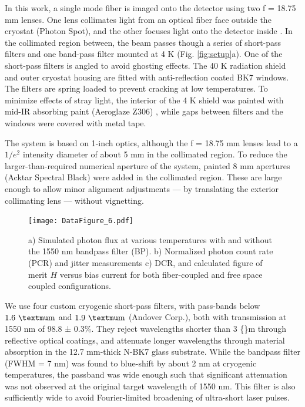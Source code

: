 \documentclass[12pt]{caltech_thesis}
\begin{document}
In this work, a single mode fiber is imaged onto the detector using two
f = 18.75 mm lenses. One lens collimates light from an optical fiber
face outside the cryostat (Photon Spot), and the other focuses light
onto the detector inside \autocite{Bellei:16}. In the collimated region
between, the beam passes though a series of short-pass filters and one
band-pass filter mounted at 4 K (Fig. \ref{fig:setup}a). One of the
short-pass filters is angled to avoid ghosting effects. The 40 K
radiation shield and outer cryostat housing are fitted with
anti-reflection coated BK7 windows. The filters are spring loaded to
prevent cracking at low temperatures. To minimize effects of stray
light, the interior of the 4 K shield was painted with mid-IR absorbing
paint (Aeroglaze Z306) \autocite{Persky1999}, while gaps between filters
and the windows were covered with metal tape.

The system is based on 1-inch optics, although the f = 18.75 mm lenses
lead to a \(1/e^2\) intensity diameter of about 5 mm in the collimated
region. To reduce the larger-than-required numerical aperture of the
system, painted 8 mm apertures (Acktar Spectral Black) were added in the
collimated region. These are large enough to allow minor alignment
adjustments --- by translating the exterior collimating lens --- without
vignetting.

\begin{figure}[htbp]
\centering
\centering\texttt{[image: DataFigure\_6.pdf]}
\caption{ \small a) Simulated photon flux at various temperatures with and without the 1550 nm bandpass filter (BP). b) Normalized photon count rate (PCR) and jitter measurements c) DCR, and calculated figure of merit $H$ versus bias current for both fiber-coupled and free space coupled configurations.}
\label{fig:false-color}
\end{figure}

We use four custom cryogenic short-pass filters, with pass-bands below
\(1.6 \ \mathrm{\textmu m}\) and \(1.9 \ \mathrm{\textmu m}\) (Andover
Corp.), both with transmission at 1550 nm of 98.8 ± 0.3\%. They reject
wavelengths shorter than 3 \{\textmu\}m through reflective optical
coatings, and attenuate longer wavelengths through material absorption
in the 12.7 mm-thick N-BK7 glass substrate. While the bandpass filter
(FWHM = 7 nm) was found to blue-shift by about 2 nm at cryogenic
temperatures, the passband was wide enough such that significant
attenuation was not observed at the original target wavelength of 1550
nm. This filter is also sufficiently wide to avoid Fourier-limited
broadening of ultra-short laser pulses.
\end{document}
